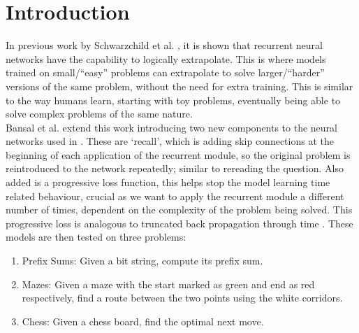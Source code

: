 \section{Introduction}






In previous work by Schwarzchild et al. \cite{schwarzschild2021can}, it is shown that recurrent neural networks have the capability to logically extrapolate. This is where models trained on small/``easy'' problems can extrapolate to solve larger/``harder'' versions of the same problem, without the need for extra training. This is similar to the way humans learn, starting with toy problems, eventually being able to solve complex problems of the same nature.\\
Bansal et al. \cite{bansal2022endtoend} extend this work introducing two new components to the neural networks used in \cite{schwarzschild2021can}. These are `recall', which is adding skip connections at the beginning of each application of the recurrent module, so the original problem is reintroduced to the network repeatedly; similar to rereading the question. Also added is a progressive loss function, this helps stop the model learning time related behaviour, crucial as we want to apply the recurrent module a different number of times, dependent on the complexity of the problem being solved. This progressive loss is analogous to truncated back propagation through time \cite{jaeger2002tutorial}. These models are then tested on three problems:

\begin{enumerate}
    \item Prefix Sums: Given a bit string, compute its prefix sum.
    \item Mazes: Given a maze with the start marked as green and end as red respectively, find a route between the two points using the white corridors.
    \item Chess: Given a chess board, find the optimal next move.
\end{enumerate}

